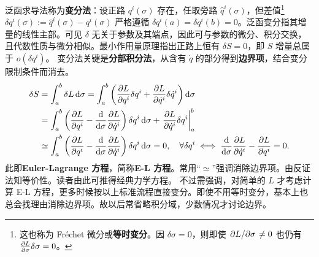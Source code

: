 泛函求导法称为\textbf{变分法}：设正路 $q^i(\sigma)$ 存在，任取旁路 $\hat q^i(\sigma)$，但差值\footnote{这也称为 Fréchet 微分或\textbf{等时变分}。因 $\delta\sigma=0$，则即使 $\pdv*{L}{\sigma}\ne 0$ 也仍有 $\pdv{L}{\sigma}\delta\sigma= 0$。} $\delta q^i(\sigma):=\hat q^i(\sigma)-q^i(\sigma)$ 严格遵循 $\delta q^i(a)=\delta q^i(b)=0$。泛函变分指其增量的线性主部。可见 $\delta$ 无关于参数及其端点，因此可与参数的微分、积分交换，且代数性质与微分相似。最小作用量原理指出正路上恒有 $\delta S=0$，即 $S$ 增量总属于 $o(\delta q^i)$。
变分法关键是\textbf{分部积分法}，从含有 $\dot q$ 的部分得到\textbf{边界项}，结合变分限制条件而消去。
\begin{align}
    \delta S&=\int_{a}^{b}\delta L\d{\sigma}=\int_{a}^{b}\bigg(\pdv{L}{q^i}\delta q^i+\pdv{L}{\dot q^i}\delta \dot q^i\bigg) \d{\sigma}\nonumber\\
    &=\int_{a}^{b}\left(\pdv{L}{q^i}-\dv{\sigma}\pdv{L}{\dot q^i}\right)\delta q^i\d{\sigma}+ \eval{\pdv{L}{\dot q^i}\delta q^i}_{a}^{b}\nonumber\\
    &\simeq\int_{a}^{b}\left(\pdv{L}{q^i}-\dv{\sigma}\pdv{L}{\dot q^i}\right)\delta q^i\d{\sigma}=0,\quad\forall \delta q^i\iff \dv{\sigma} \pdv{L}{\dot q^i}-\pdv{L}{q^i}=0.
\end{align}
此即\textbf{Euler-Lagrange 方程}，简称\textbf{E-L 方程}。常用“$\simeq$”强调消除边界项。由反证法知等价性。读者由此可推得经典力学方程。
不过需强调，对简单的 $L$ 才考虑计算 E-L 方程，更多时候按以上标准流程直接变分。即使不用等时变分，基本上也总会找理由消除边界项。故以后常省略积分域，少数情况才讨论边界。

